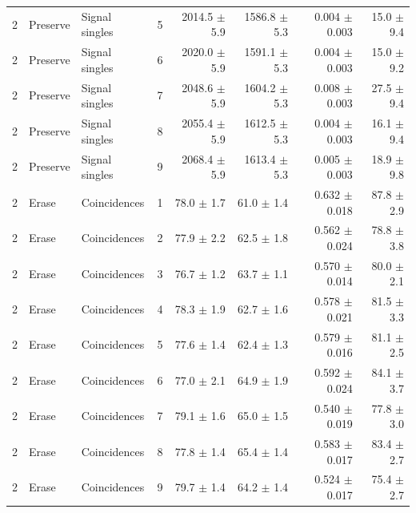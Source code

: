 \begin{tabular}{llllrrrr}
2 & Preserve & Signal singles & 5 & 2014.5 \ensuremath{\pm} 5.9 & 1586.8 \ensuremath{\pm} 5.3 & 0.004 \ensuremath{\pm} 0.003 & 15.0 \ensuremath{\pm} 9.4 \\
2 & Preserve & Signal singles & 6 & 2020.0 \ensuremath{\pm} 5.9 & 1591.1 \ensuremath{\pm} 5.3 & 0.004 \ensuremath{\pm} 0.003 & 15.0 \ensuremath{\pm} 9.2 \\
2 & Preserve & Signal singles & 7 & 2048.6 \ensuremath{\pm} 5.9 & 1604.2 \ensuremath{\pm} 5.3 & 0.008 \ensuremath{\pm} 0.003 & 27.5 \ensuremath{\pm} 9.4 \\
2 & Preserve & Signal singles & 8 & 2055.4 \ensuremath{\pm} 5.9 & 1612.5 \ensuremath{\pm} 5.3 & 0.004 \ensuremath{\pm} 0.003 & 16.1 \ensuremath{\pm} 9.4 \\
2 & Preserve & Signal singles & 9 & 2068.4 \ensuremath{\pm} 5.9 & 1613.4 \ensuremath{\pm} 5.3 & 0.005 \ensuremath{\pm} 0.003 & 18.9 \ensuremath{\pm} 9.8 \\
\midrule
2 & Erase & Coincidences & 1 & 78.0 \ensuremath{\pm} 1.7 & 61.0 \ensuremath{\pm} 1.4 & 0.632 \ensuremath{\pm} 0.018 & 87.8 \ensuremath{\pm} 2.9 \\
2 & Erase & Coincidences & 2 & 77.9 \ensuremath{\pm} 2.2 & 62.5 \ensuremath{\pm} 1.8 & 0.562 \ensuremath{\pm} 0.024 & 78.8 \ensuremath{\pm} 3.8 \\
2 & Erase & Coincidences & 3 & 76.7 \ensuremath{\pm} 1.2 & 63.7 \ensuremath{\pm} 1.1 & 0.570 \ensuremath{\pm} 0.014 & 80.0 \ensuremath{\pm} 2.1 \\
2 & Erase & Coincidences & 4 & 78.3 \ensuremath{\pm} 1.9 & 62.7 \ensuremath{\pm} 1.6 & 0.578 \ensuremath{\pm} 0.021 & 81.5 \ensuremath{\pm} 3.3 \\
2 & Erase & Coincidences & 5 & 77.6 \ensuremath{\pm} 1.4 & 62.4 \ensuremath{\pm} 1.3 & 0.579 \ensuremath{\pm} 0.016 & 81.1 \ensuremath{\pm} 2.5 \\
2 & Erase & Coincidences & 6 & 77.0 \ensuremath{\pm} 2.1 & 64.9 \ensuremath{\pm} 1.9 & 0.592 \ensuremath{\pm} 0.024 & 84.1 \ensuremath{\pm} 3.7 \\
2 & Erase & Coincidences & 7 & 79.1 \ensuremath{\pm} 1.6 & 65.0 \ensuremath{\pm} 1.5 & 0.540 \ensuremath{\pm} 0.019 & 77.8 \ensuremath{\pm} 3.0 \\
2 & Erase & Coincidences & 8 & 77.8 \ensuremath{\pm} 1.4 & 65.4 \ensuremath{\pm} 1.4 & 0.583 \ensuremath{\pm} 0.017 & 83.4 \ensuremath{\pm} 2.7 \\
2 & Erase & Coincidences & 9 & 79.7 \ensuremath{\pm} 1.4 & 64.2 \ensuremath{\pm} 1.4 & 0.524 \ensuremath{\pm} 0.017 & 75.4 \ensuremath{\pm} 2.7 \\

\end{tabular}
